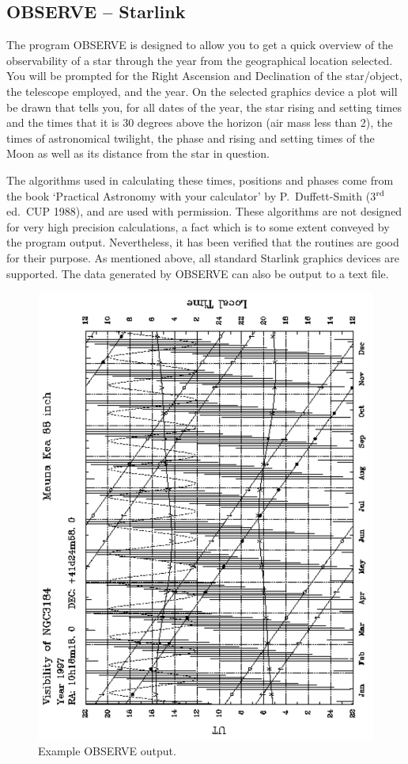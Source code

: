 \documentclass[twoside,11pt]{article}
\newcommand{\htmladdnormallink}[2]{#1}
\newcommand{\xref}[3]{#1}
\newcommand{\xlabel}[1]{}
\newcommand{\OBSERVEref}{\xref{OBSERVE}{sun146}{}}
\newcommand{\STARLINKref}{\htmladdnormallink{Starlink}{http://www.starlink.ac.uk/}}
\begin{document}
\subsection{{\OBSERVEref} -- {\STARLINKref}} \xlabel{OBSERVE}
\label{sec:observe}

The program {\OBSERVEref} is designed to allow you to get a quick overview
of the observability of a star through the year from the geographical
location selected. You will be prompted for the Right Ascension and Declination
of the star/object, the telescope employed, and the year. On the selected
graphics device a
plot will be drawn that tells you, for all dates of the year, the star rising
and setting times and the times that it is 30 degrees above the horizon
(air mass less than 2), the
times of astronomical twilight, the phase and rising and setting times of the
Moon as well as its distance from the star in question.

The algorithms used in calculating these times, positions and phases come
from the book `Practical Astronomy with your calculator' by
P.~Duffett-Smith (3$^{\rm rd}$ ed.~CUP 1988), and are used with permission.
These algorithms are not designed for very high precision calculations, a
fact which is to some extent conveyed by the program output. Nevertheless,
it has been verified that the routines are good for their purpose.
As mentioned above, all standard Starlink graphics devices are supported.
The data generated by {\OBSERVEref} can also be output to a text file.

\begin{figure}[htbp]
\leavevmode
\centering \includegraphics{sg10_obs}
\caption{Example OBSERVE output.}
\end{figure}
\end{document}
